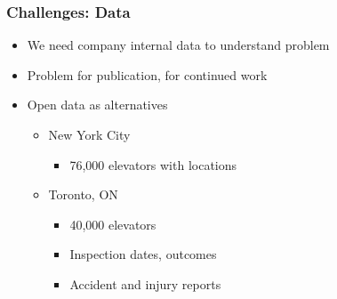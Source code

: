 
\begin{frame}
\frametitle{Challenges: Data}
\begin{itemize}
\item We need company internal data to understand problem
\item Problem for publication, for continued work
\item Open data as alternatives
\begin{itemize}
\item New York City
\begin{itemize}
\item 76,000 elevators with locations
\end{itemize}
\item Toronto, ON
\begin{itemize}
\item 40,000 elevators
\item Inspection dates, outcomes
\item Accident and injury reports
\end{itemize}
\end{itemize}
\end{itemize}
\end{frame}




